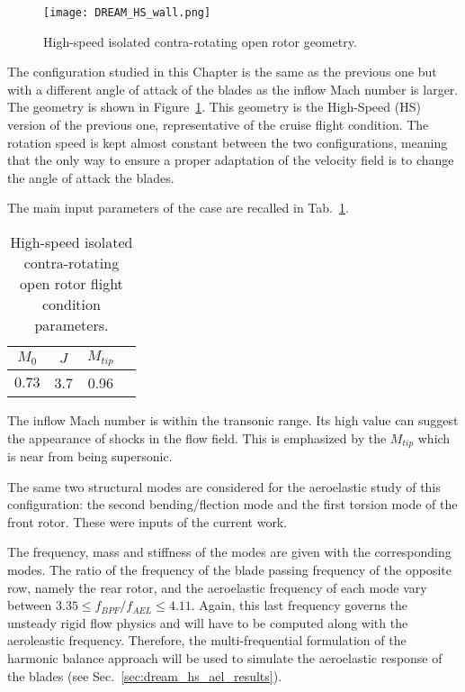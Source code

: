 
\begin{figure}[htp]
  \centering
  \texttt{[image: DREAM\_HS\_wall.png]}
  \caption{High-speed isolated contra-rotating open rotor geometry.}
  \label{fig:dream_hs_wall}
\end{figure}

The configuration studied in this Chapter is the same as the
previous one but with a different angle of attack of
the blades as the inflow Mach number is larger. 
The geometry is shown in Figure~\ref{fig:dream_hs_wall}.
This geometry is the High-Speed (HS) version of the previous one, 
representative of the cruise flight condition. The rotation speed is kept
almost constant between the two configurations, meaning that
the only way to ensure
a proper adaptation of the velocity field is to change the angle of 
attack the blades.

The main input parameters of the case are recalled in
Tab.~\ref{tab:dream_hs_flight_condition}.
\begin{table}[htp]
   \centering
  \begin{tabular}{cccc}
    \toprule
    $M_0$ & $J$ & $M_{tip}$ \\
    \midrule
    $0.73$ & 3.7 & 0.96  \\
    \bottomrule
  \end{tabular}
  \caption{High-speed isolated contra-rotating open rotor flight condition parameters.}
  \label{tab:dream_hs_flight_condition}
\end{table} 
The inflow Mach number is within the transonic range. Its high value
can suggest the appearance of shocks in the flow field. 
This is emphasized by the $M_{tip}$ which is
near from being supersonic.

The same two structural modes are considered for the aeroelastic study of this 
configuration: the second bending/flection mode and the first torsion mode
of the front rotor. These were inputs of the current work.

The frequency, mass and stiffness of the modes 
are given with the corresponding modes.
The ratio of the frequency of the blade passing 
frequency of the opposite row, namely the rear rotor,
and the aeroelastic frequency of
each mode vary between 
$3.35 \leq f_{BPF} / f_{AEL} \leq 4.11$. Again,
this last frequency governs the unsteady rigid flow physics 
and will have to be computed along with the aeroleastic frequency.
Therefore, the multi-frequential formulation of the
harmonic balance approach will be used to simulate the
aeroelastic response of the blades (see Sec.~\ref{sec:dream_hs_ael_results}).
